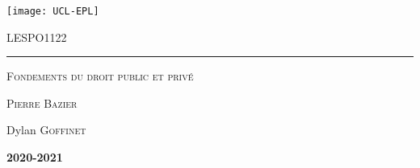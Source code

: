\documentclass{customSynthesis}
\begin{document}

\begin{titlepage}
	\flushleft\texttt{[image: UCL-EPL]}\\
	\vspace*{2cm}
	\vspace*{\fill}
	\centering
	{\scshape\LARGE LESPO1122 \par}
	\vspace{0.4cm}
	{\color{clearBlue}\rule{0.7\textwidth}{1pt}\par}
	\vspace{0.5cm}
	{\scshape\Large Fondements du droit public et privé\par}
	\vspace{0.5cm}
	{\scshape\large Pierre Bazier\par}
	\vspace{1cm}
	{\scshape\large  \par} %
	{\Large\itshape\par}
	\vspace*{\fill}
	\vfill
	\vfill
	{\Large Dylan \textsc{Goffinet}\par}
	\vspace{0.5cm}
	{\Large\bfseries 2020-2021\par}
	{\large \par}
\end{titlepage}


\setcounter{tocdepth}{2} %
\tableofcontents
\thispagestyle{empty} %
\clearpage
{}




\end{document}
